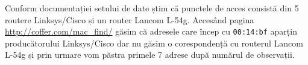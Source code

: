 \documentclass[]{article}
\newenvironment{Shaded}{\begin{snugshade}}{\end{snugshade}}
\newcommand{\KeywordTok}[1]{\textcolor[rgb]{0.13,0.29,0.53}{\textbf{#1}}}
\newcommand{\DataTypeTok}[1]{\textcolor[rgb]{0.13,0.29,0.53}{#1}}
\newcommand{\DecValTok}[1]{\textcolor[rgb]{0.00,0.00,0.81}{#1}}
\newcommand{\StringTok}[1]{\textcolor[rgb]{0.31,0.60,0.02}{#1}}
\newcommand{\CommentTok}[1]{\textcolor[rgb]{0.56,0.35,0.01}{\textit{#1}}}
\newcommand{\OtherTok}[1]{\textcolor[rgb]{0.56,0.35,0.01}{#1}}
\newcommand{\OperatorTok}[1]{\textcolor[rgb]{0.81,0.36,0.00}{\textbf{#1}}}
\newcommand{\NormalTok}[1]{#1}
\begin{document}
Conform documentației setului de date știm că punctele de acces consistă
din 5 routere Linksys/Cisco și un router Lancom L-54g. Accesând pagina
\url{http://coffer.com/mac_find/} găsim că adresele care încep cu
\texttt{00:14:bf} aparțin producătorului Linksys/Cisco dar nu găsim o
corespondență cu routerul Lancom L-54g și prin urmare vom păstra primele
7 adrese după numărul de observații.

\begin{Shaded}
\begin{Highlighting}[]
\NormalTok{subMacs =}\StringTok{ }\KeywordTok{names}\NormalTok{(}\KeywordTok{sort}\NormalTok{(}\KeywordTok{table}\NormalTok{(offline}\OperatorTok{$}\NormalTok{mac), }\DataTypeTok{decreasing =} \OtherTok{TRUE}\NormalTok{))[}\DecValTok{1}\OperatorTok{:}\DecValTok{7}\NormalTok{]}

\CommentTok{# stergem observatiile canu nu se MAC-ul corespunzator}
\NormalTok{offline =}\StringTok{ }\NormalTok{offline[offline}\OperatorTok{$}\NormalTok{mac }\OperatorTok{%

}
\end{Highlighting}
\end{Shaded}
\end{document}

